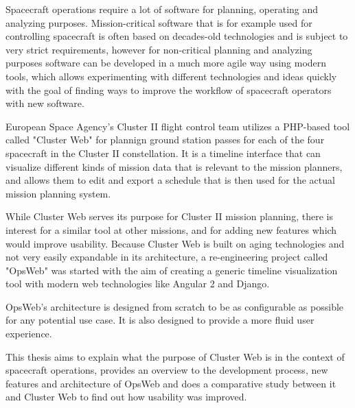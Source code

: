 Spacecraft operations require a lot of software for planning, operating and analyzing purposes. Mission-critical software that is for example used for controlling spacecraft is often based on decades-old technologies and is subject to very strict requirements, however for non-critical planning and analyzing purposes software can be developed in a much more agile way using modern tools, which allows experimenting with different technologies and ideas quickly with the goal of finding ways to improve the workflow of spacecraft operators with new software.

European Space Agency's Cluster II flight control team utilizes a PHP-based tool called "Cluster Web" for plannign ground station passes for each of the four spacecraft in the Cluster II constellation. It is a timeline interface that can visualize different kinds of mission data that is relevant to the mission planners, and allows them to edit and export a schedule that is then used for the actual mission planning system.

While Cluster Web serves its purpose for Cluster II mission planning, there is interest for a similar tool at other missions, and for adding new features which would improve usability. Because Cluster Web is built on aging technologies and not very easily expandable in its architecture, a re-engineering project called "OpsWeb" was started with the aim of creating a generic timeline visualization tool with modern web technologies like Angular 2 and Django.

OpsWeb's architecture is designed from scratch to be as configurable as possible for any potential use case. It is also designed to provide a more fluid user experience.

This thesis aims to explain what the purpose of Cluster Web is in the context of spacecraft operations, provides an overview to the development process, new features and architecture of OpsWeb and does a comparative study between it and Cluster Web to find out how usability was improved.
